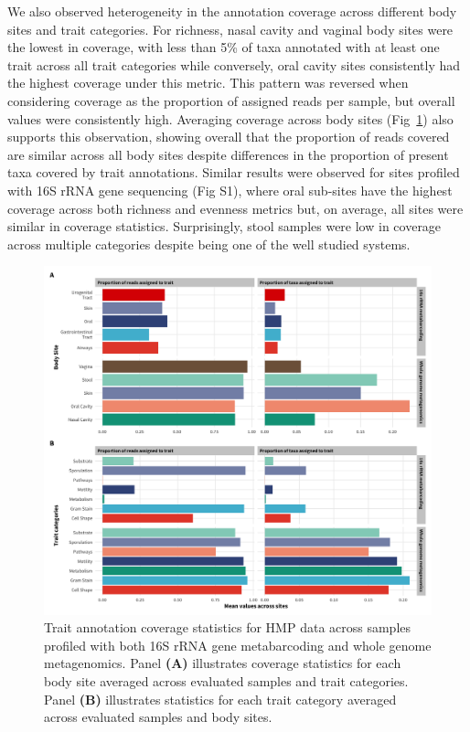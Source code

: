 \documentclass{bmcart}
\begin{document}
We also observed heterogeneity in the annotation coverage across different body sites and trait categories. For richness, nasal cavity and vaginal body sites were the lowest in coverage, with less than 5\% of taxa annotated with at least one trait across all trait categories while conversely, oral cavity sites consistently had the highest coverage under this metric. This pattern was reversed when considering coverage as the proportion of assigned reads per sample, but overall values were consistently high. Averaging coverage across body sites (Fig~\ref{fig:2}) also supports this observation, showing overall that the proportion of reads covered are similar across all body sites despite differences in the proportion of present taxa covered by trait annotations. Similar results were observed for sites profiled with 16S rRNA gene sequencing (Fig S1), where oral sub-sites have the highest coverage across both richness and evenness metrics but, on average, all sites were similar in coverage statistics. Surprisingly, stool samples were low in coverage across multiple categories despite being one of the well studied systems. 

\begin{figure}[!h]
\includegraphics[width=0.99\linewidth]{figures/coverage_by_joint_agg.png}
\caption{Trait annotation coverage statistics for HMP data across samples profiled with both 16S rRNA gene metabarcoding and whole genome metagenomics. Panel \textbf{(A)} illustrates coverage statistics for each body site averaged across evaluated samples and trait categories. Panel \textbf{(B)} illustrates statistics for each trait category averaged across evaluated samples and body sites.}
\label{fig:2}
\end{figure}
\end{document}
